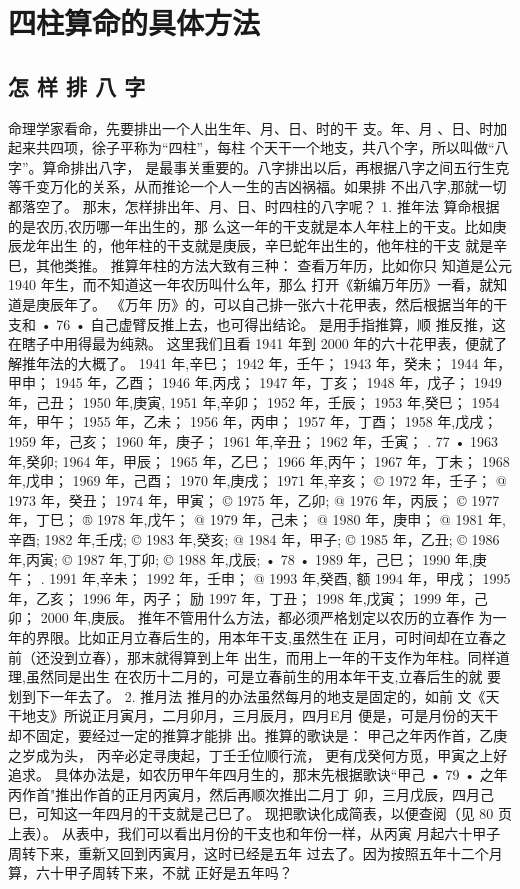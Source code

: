 \chapter{四柱算命的具体方法}
\section{怎 样 排 八 字}
命理学家看命，先要排出一个人出生年、月、日、时的干
支。年、月 、日、时加起来共四项，徐子平称为“四柱”，每柱
个天干一个地支，共八个字，所以叫做“八字”。算命排出八字，
是最事关重要的。八字排出以后，再根据八字之间五行生克
等千变万化的关系，从而推论一个人一生的吉凶祸福。如果排
不出八字,那就一切都落空了。
那末，怎样排出年、月、日、时四柱的八字呢？
1. 推年法 算命根据的是农历,农历哪一年出生的，那
么这一年的干支就是本人年柱上的干支。比如庚辰龙年出生
的，他年柱的干支就是庚辰，辛巳蛇年出生的，他年柱的干支
就是辛巳，其他类推。
推算年柱的方法大致有三种： 查看万年历，比如你只
知道是公元 1940 年生，而不知道这一年农历叫什么年，那么
打开《新编万年历》一看，就知道是庚辰年了。 《万年
历》的，可以自己排一张六十花甲表，然后根据当年的干支和
• 76 •
自己虚臂反推上去，也可得出结论。 是用手指推算，顺
推反推，这在瞎子中用得最为纯熟。
这里我们且看 1941 年到 2000 年的六十花甲表，便就了
解推年法的大概了。
1941 年,辛巳；
1942 年，壬午；
1943 年，癸未；
1944 年，甲申；
1945 年，乙酉；
1946 年,丙戌；
1947 年，丁亥；
1948 年，戊子；
1949 年，己丑；
1950 年,庚寅,
1951 年,辛卯；
1952 年，壬辰；
1953 年,癸巳；
1954 年，甲午；
1955 年，乙未；
1956 年，丙申；
1957 年，丁酉；
1958 年,戊戌；
1959 年，己亥；
1960 年，庚子；
1961 年,辛丑；
1962 年，壬寅；
. 77 •
1963 年,癸卯;
1964 年，甲辰；
1965 年，乙巳；
1966 年,丙午；
1967 年，丁未；
1968 年,戊申；
1969 年，己酉；
1970 年,庚戌；
1971 年,辛亥；
© 1972 年，壬子；
@ 1973 年，癸丑；
1974 年，甲寅；
© 1975 年，乙卯;
@ 1976 年，丙辰；
© 1977 年，丁巳；
® 1978 年,戊午；
@ 1979 年，己未；
@ 1980 年，庚申；
@ 1981 年,辛酉;
1982 年,壬戌;
© 1983 年,癸亥;
@ 1984 年，甲子;
© 1985 年，乙丑;
© 1986 年,丙寅;
© 1987 年,丁卯;
© 1988 年,戊辰;
• 78 •
1989 年，己巳；
1990 年,庚午；
. 1991 年,辛未；
1992 年，壬申；
@ 1993 年,癸酉,
额 1994 年，甲戌；
1995 年，乙亥；
1996 年，丙子；
励 1997 年，丁丑；
1998 年,戊寅；
1999 年，己卯；
2000 年,庚辰。
推年不管用什么方法，都必须严格划定以农历的立春作
为一年的界限。比如正月立春后生的，用本年干支,虽然生在
正月，可时间却在立春之前（还没到立春），那末就得算到上年
出生，而用上一年的干支作为年柱。同样道理,虽然同是出生
在农历十二月的，可是立春前生的用本年干支,立春后生的就
要划到下一年去了。
2. 推月法 推月的办法虽然每月的地支是固定的，如前
文《天干地支》所说正月寅月，二月卯月，三月辰月，四月E月
便是，可是月份的天干却不固定，要经过一定的推算才能排
出。推算的歌诀是：
甲己之年丙作首，乙庚之岁成为头，
丙辛必定寻庚起，丁壬壬位顺行流，
更有戊癸何方觅，甲寅之上好追求。
具体办法是，如农历甲午年四月生的，那末先根据歌诀“甲己
• 79 •
之年丙作首"推出作首的正月丙寅月，然后再顺次推出二月丁
卯，三月戊辰，四月己巳，可知这一年四月的干支就是己巳了。
现把歌诀化成简表，以便查阅（见 80 页上表）。
从表中，我们可以看出月份的干支也和年份一样，从丙寅
月起六十甲子周转下来，重新又回到丙寅月，这时已经是五年
过去了。因为按照五年十二个月算，六十甲子周转下来，不就
正好是五年吗？

